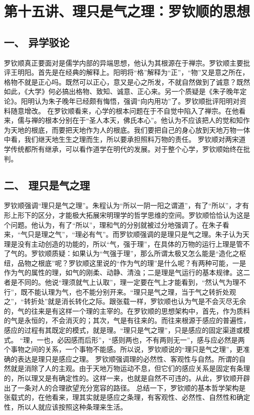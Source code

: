 \documentclass{article}
\begin{document}
\section{第十五讲、理只是气之理：罗钦顺的思想}
\subsection{一、	异学驳论}
罗钦顺真正要面对是儒学内部的异端思想，他认为其根源在于禅宗。罗钦顺主要批评王明阳。首先是在经典的解释上。阳明将“格”解释为“正”，“物”又是意之所在，格物不就是正心吗。既然可以正心，意又是心之所发，不就自然做到了诚意？既然如此，《大学》何必搞出格物、致知、诚意、正心来。另一个质疑是《朱子晚年定论》。阳明认为朱子晚年已经颇有悔悟，强调“向内用功”了。罗钦顺批评阳明对资料随意增改。
在罗钦顺看来，心学的根本问题在于不自觉中陷入了禅宗。在他看来，儒与禅的根本分别在于“圣人本天，佛氏本心”。他认为不应该把人的觉和知作为天地的根底，而要把天地作为人的根底。我们要把自己的身心放到天地万物一体中看，我们继天地生生之理而生，所以要承担照料万物的责任。
罗钦顺对两宋道学传统都所有继承，可以看作道学在明代的发展。对于整个心学，罗钦顺始终在批判。
\subsection{二、	理只是气之理}
罗钦顺强调“理只是气之理”。朱程认为“所以一阴一阳之谓道”，有了“所以”，才有形上形下的区分，才能极大拓展宋明理学的哲学思维的空间。罗钦顺恰恰认为这是个问题。他认为，有了“所以”，理和气的分别就被过分地强调了。在朱子看来，“气只是理之气”，“理必有气”。而罗钦顺强调的是理只是气之理。朱子认为天理是没有主动创造的功能的，所以“气，强于理”，在具体的万物的运行上理是管不了气的。罗钦顺质疑：如果认为“气强于理”，那么所谓太极又怎么能是“造化之枢纽，品物之根底”呢？罗钦顺这里说的“作为气的理”是什么呢？有两种可能，一是作为气的属性的理，如气的刚柔、动静、清浊；二是理是气运行的基本规律。这二者是不同的。他说“理须就气上认取”，理一定要在气上才能看到，“然认气为理不行”，既不能认理为气，也不能分别开来。“理只是气之理，当于气之转折处观之”，“转折处”就是消长转化之际。跟张载一样，罗钦顺也认为气是不会灭尽无余的，气的往来是有这样一个理的主宰的。在罗钦顺的思想架构中，首先，作为质料的气是永恒的，不会消灭的；其次，气是有往来的。而往来根源于感应的普遍性，感应的过程有其既定的模式，就是理。“理只是气之理”，只是感应的固定渠道或模式。
“理，一也，必因感而后形”，“感则两也，不有两则无一”，感与应必然是两个事物之间的关系，一个事物不能感。所以说，罗钦顺说的“理只是气之理”，更准确的表达是理只是感应之理。
罗钦顺强调理的必然性、客观性与自然。所谓的自然就是消除了人的主观。由于天地万物运动不息，但它们的感应关系是固定有条理的，所以理又是有确定性的。这样一来，也就是自然不可违的。从此，罗钦顺开辟出了一条对人的合理欲望充分宽容的路径。
总结一下，罗钦顺的基本哲学架构是张载式的，在他看来，理其实就是感应之条理，有客观性、必然性、自然性和确定性，所以人就应该按照这种条理来生活。
\end{document}
